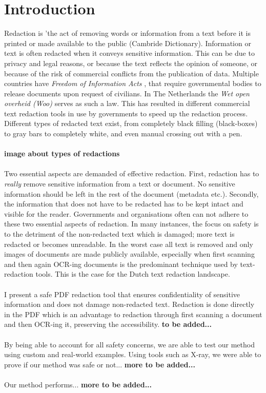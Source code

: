 \chapter{Introduction}

Redaction is 'the act of removing words or information from a text before it is printed or made available to the public (Cambride Dictionary). Information or text is often redacted when it conveys sensitive information. This can be due to privacy and legal reasons, or because the text reflects the opinion of someone, or because of the risk of commercial conflicts from the publication of data. Multiple countries have \textit{Freedom of Information Acts} \cite{USAFia}, that require governmental bodies to release documents upon request of civilians. In The Netherlands the \textit{Wet open overheid (Woo)} \cite{WooWebsite} serves as such a law. This has resulted in different commercial text redaction tools in use by governments to speed up the redaction process. Different types of redacted text exist, from completely black filling (black-boxes) to gray bars to completely white, and even manual crossing out with a pen.
\\\\
\textbf{image about types of redactions}
\\\\
Two essential aspects are demanded of effective redaction. First, redaction has to \textit{really} remove sensitive information from a text or document. No sensitive information should be left in the rest of the document (metadata etc.). Secondly, the information that does not have to be redacted has to be kept intact and visible for the reader. Governments and organisations often can not adhere to these two essential aspects of redaction. In many instances, the focus on safety is to the detriment of the non-redacted text which is damaged; more text is redacted or becomes unreadable. In the worst case all text is removed and only images of documents are made publicly available, especially when first scanning and then again OCR-ing documents is the predominant technique used by text-redaction tools. This is the case for the Dutch text redaction landscape.
\\\\
I present a safe PDF redaction tool that ensures confidentiality of sensitive information and does not damage non-redacted text. Redaction is done directly in the PDF which is an advantage to redaction through first scanning a document and then OCR-ing it, preserving the accessibility.  \textbf{to be added...}
\\\\
By being able to account for all safety concerns, we are able to test our method using custom and real-world examples. Using tools such as X-ray, we were able to prove if our method was safe or not... \textbf{more to be added...}
\\\\
Our method performs... \textbf{more to be added...}


